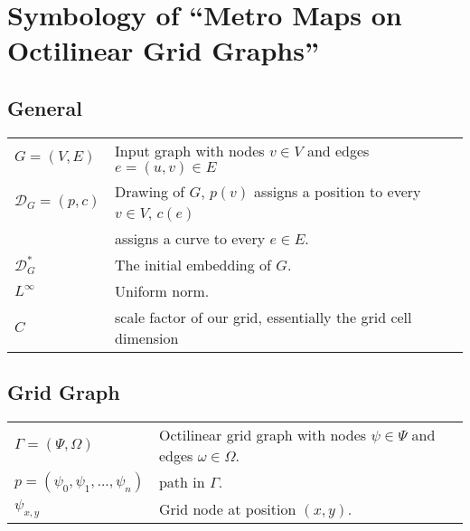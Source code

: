 \documentclass{article}
\makeatletter
\newenvironment{eqdesc}
  {\par\vspace{\abovedisplayskip}\noindent\begin{tabular}{>{$}l<{$} @{${}\hspace{0.6cm}{}$} l}}
  {\end{tabular}\par\vspace{\belowdisplayskip}}
\makeatother
\begin{document}
\section{Symbology of ``Metro Maps on Octilinear Grid Graphs''}

\subsection{General}

\begin{eqdesc}
	G = (V, E)     &  Input graph with nodes $v \in V$ and edges $e = (u, v) \in E$ \\
	\mathcal{D}_G = (p, c)     &  Drawing of $G$, $p(v)$ assigns a position to every $v \in V$, $c(e)$ \\
	 & assigns a curve to every $e \in E$. \\   
	\mathcal{D}^*_G &  The initial embedding of $G$. \\
	L^{\infty} & Uniform norm. \\
	C & scale factor of our grid, essentially the grid cell dimension
\end{eqdesc}

\subsection{Grid Graph}

\begin{eqdesc}
	\Gamma  = (\Psi, \Omega)     &  Octilinear grid graph with nodes $\psi \in \Psi$ and edges $\omega \in \Omega$.\\
	p = (\psi_0, \psi_1, ..., \psi_n)  & path in $\Gamma$.\\
	\psi_{x, y} & Grid node at position $(x, y)$.
\end{eqdesc}
\end{document}
